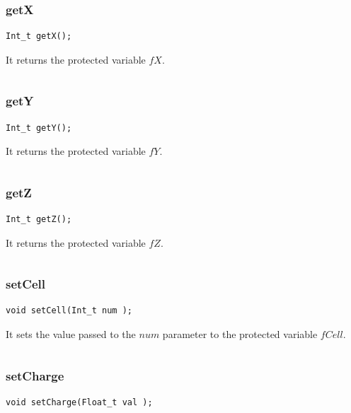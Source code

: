 \documentclass[a4paper]{book}
\begin{document}
\subsubsection{getX}

\begin{lstlisting}[style=customc]
Int_t getX();
\end{lstlisting}

It returns the protected variable $fX$.

\[\]

\subsubsection{getY}

\begin{lstlisting}[style=customc]
Int_t getY();
\end{lstlisting}

It returns the protected variable $fY$.

\[\]

\subsubsection{getZ}

\begin{lstlisting}[style=customc]
Int_t getZ();
\end{lstlisting}

It returns the protected variable $fZ$.

\[\]

\subsubsection{setCell}

\begin{lstlisting}[style=customc]
void setCell(Int_t num );
\end{lstlisting}

It sets the value passed to the $num$ parameter to the protected variable $fCell$.

\[\]

\subsubsection{setCharge}

\begin{lstlisting}[style=customc]
void setCharge(Float_t val );
\end{lstlisting}
\end{document}
